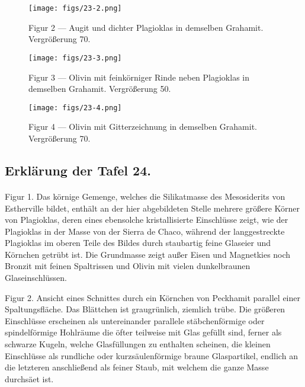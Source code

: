\documentclass[a4paper, 11pt, oneside, polutonikogreek, german]{article}
\begin{document}
\vspace*{\fill}
\begin{figure}[H]
\centering
\texttt{[image: figs/23-2.png]}
\caption{\small Figur 2 --- Augit und dichter Plagioklas in demselben Grahamit. Vergrößerung 70.}
\end{figure}
\vspace*{\fill}
\clearpage

\vspace*{\fill}
\begin{figure}[H]
\centering
\texttt{[image: figs/23-3.png]}
\caption{\small Figur 3 --- Olivin mit feinkörniger Rinde neben Plagioklas in demselben Grahamit. Vergrößerung 50.}
\end{figure}
\vspace*{\fill}
\clearpage

\vspace*{\fill}
\begin{figure}[H]
\centering
\texttt{[image: figs/23-4.png]}
\caption{\small Figur 4 --- Olivin mit Gitterzeichnung in demselben Grahamit. Vergrößerung 70.}
\end{figure}
\vspace*{\fill}
\clearpage

\subsection{Erklärung der Tafel 24.}
\paragraph{}
Figur 1. Das körnige Gemenge, welches die Silikatmasse des Mesosiderits von Estherville bildet, enthält an der hier abgebildeten Stelle mehrere größere Körner von Plagioklas, deren eines ebensolche kristallisierte Einschlüsse zeigt, wie der Plagioklas in der Masse von der Sierra de Chaco, während der langgestreckte Plagioklas im oberen Teile des Bildes durch staubartig feine Glaseier und Körnchen getrübt ist. Die Grundmasse zeigt außer Eisen und Magnetkies noch Bronzit mit feinen Spaltrissen und Olivin mit vielen dunkelbraunen Glaseinschlüssen.

Figur 2. Ansicht eines Schnittes durch ein Körnchen von Peckhamit parallel einer Spaltungsfläche. Das Blättchen ist graugrünlich, ziemlich trübe. Die größeren Einschlüsse erscheinen als untereinander parallele stäbchenförmige oder spindelförmige Hohlräume die öfter teilweise mit Glas gefüllt sind, ferner als schwarze Kugeln, welche Glasfüllungen zu enthalten scheinen, die kleinen Einschlüsse als rundliche oder kurzsäulenförmige braune Glaspartikel, endlich an die letzteren anschließend als feiner Staub, mit welchem die ganze Masse durchsäet ist.
\end{document}
